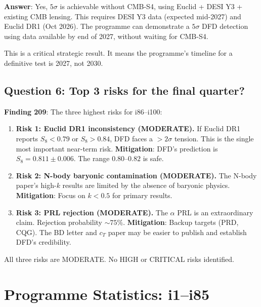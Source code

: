 \documentclass[11pt,a4paper]{article}
\begin{document}
\textbf{Answer}: Yes, $5\sigma$ is achievable without CMB-S4, using Euclid + DESI Y3 + existing CMB lensing. This requires DESI Y3 data (expected mid-2027) and Euclid DR1 (Oct 2026). The programme can demonstrate a $5\sigma$ DFD detection using data available by end of 2027, without waiting for CMB-S4.

This is a critical strategic result. It means the programme's timeline for a definitive test is 2027, not 2030.

\subsection{Question 6: Top 3 risks for the final quarter?}

\textbf{Finding 209}: The three highest risks for i86--i100:

\begin{enumerate}[nosep]
\item \textbf{Risk 1: Euclid DR1 inconsistency (MODERATE).} If Euclid DR1 reports $S_8 < 0.79$ or $S_8 > 0.84$, DFD faces a $> 2\sigma$ tension. This is the single most important near-term risk. \textbf{Mitigation}: DFD's prediction is $S_8 = 0.811 \pm 0.006$. The range $0.80$--$0.82$ is safe.

\item \textbf{Risk 2: N-body baryonic contamination (MODERATE).} The N-body paper's high-$k$ results are limited by the absence of baryonic physics. \textbf{Mitigation}: Focus on $k < 0.5$ for primary results.

\item \textbf{Risk 3: PRL rejection (MODERATE).} The $\alpha$ PRL is an extraordinary claim. Rejection probability $\sim 75\%$. \textbf{Mitigation}: Backup targets (PRD, CQG). The BD letter and $c_T$ paper may be easier to publish and establish DFD's credibility.
\end{enumerate}

All three risks are MODERATE. No HIGH or CRITICAL risks identified.

\section{Programme Statistics: i1--i85}
\end{document}
